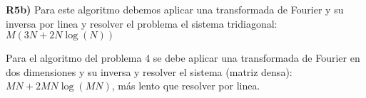 \documentclass{article}
\begin{document}
\begin{enumerate}
    \textbf{R5b)} Para este algoritmo debemos aplicar una transformada de Fourier y su inversa por linea y resolver el problema el sistema tridiagonal: $M(3N + 2N\log(N))$
    
    Para el algoritmo del problema 4 se debe aplicar una transformada de Fourier en 
    dos dimensiones y su inversa y resolver el sistema (matriz densa):
    $MN + 2MN\log(MN)$, más lento que resolver por linea.
\end{enumerate}
\end{document}
